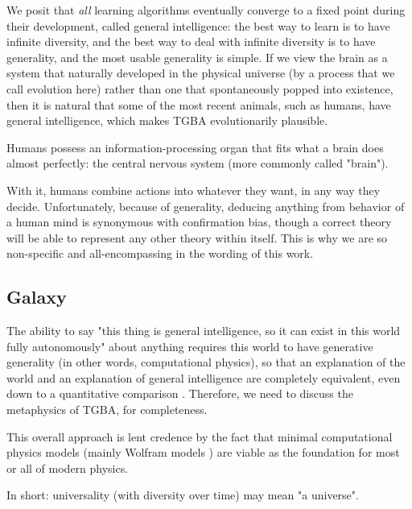 \documentclass{article}
\begin{document}
We posit that \textit{all} learning algorithms eventually converge to a fixed point during their development, called general intelligence: the best way to learn is to have infinite diversity, and the best way to deal with infinite diversity is to have generality, and the most usable generality is simple. If we view the brain as a system that naturally developed in the physical universe (by a process that we call evolution here) rather than one that spontaneously popped into existence, then it is natural that some of the most recent animals, such as humans, have general intelligence, which makes TGBA evolutionarily plausible.

Humans possess an information-processing organ that fits what a brain does almost perfectly: the central nervous system (more commonly called "brain").

With it, humans combine actions into whatever they want, in any way they decide. Unfortunately, because of generality, deducing anything from behavior of a human mind is synonymous with confirmation bias, though a correct theory will be able to represent any other theory within itself. This is why we are so non-specific and all-encompassing in the wording of this work.

\subsection{Galaxy}

The ability to say "this thing is general intelligence, so it can exist in this world fully autonomously" about anything requires this world to have generative generality (in other words, computational physics), so that an explanation of the world and an explanation of general intelligence are completely equivalent, even down to a quantitative comparison \cite{10.3389/fphy.2020.525731}. Therefore, we need to discuss the metaphysics of TGBA, for completeness.

This overall approach is lent credence by the fact that minimal computational physics models (mainly Wolfram models \cite{Wolfram_2020}) are viable as the foundation for most or all of modern physics.

In short: universality (with diversity over time) may mean "a universe".
\end{document}

